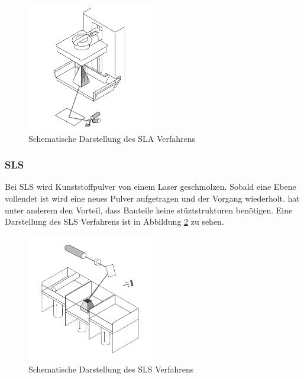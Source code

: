 \begin{figure}[H]
    \centering
    \includegraphics[width=0.5\textwidth]{images/sla.png}
    \caption{Schematische Darstellung des \ac{SLA} Verfahrens }
    \label{fig:sla}
\end{figure}

\subsubsection{\ac{SLS}}

Bei \ac{SLS} wird Kunststoffpulver von einem Laser geschmolzen. Sobald eine Ebene vollendet ist wird eine neues Pulver aufgetragen und der Vorgang wiederholt.  hat unter anderem den Vorteil, dass Bauteile keine stüztstrukturen benötigen. Eine Darstellung des \ac{SLS} Verfahrens ist in Abbildung \ref{fig:sls} zu sehen.\\

\begin{figure}[H]
    \centering
    \includegraphics[width=0.5\textwidth]{images/sls.png}
    \caption{Schematische Darstellung des \ac{SLS} Verfahrens }
    \label{fig:sls}
\end{figure}